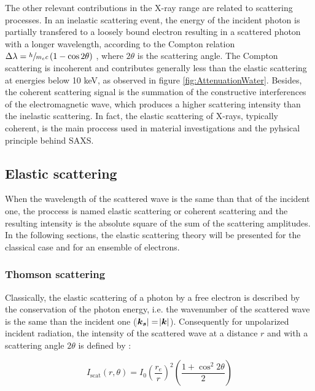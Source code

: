 The other relevant contributions in the X-ray range are related to scattering processes. In an inelastic scattering event, the energy of the incident photon is partially transfered to a loosely bound electron resulting in a scattered photon with a longer wavelength, according to the Compton relation $\Delta\lambda = \sfrac{h}{m_e c}\left( 1 - \cos{2\theta} \right) $ \citep{als-nielsen_elements_2011}, where $2\theta$ is the scattering angle. The Compton scattering is incoherent and contributes generally less than the elastic scattering at energies below 10 keV, as observed in figure \ref{fig:AttenuationWater}. Besides, the coherent scattering signal is the summation of the constructive interferences of the electromagnetic wave, which produces a higher scattering intensity than the inelastic scattering. In fact, the elastic scattering of X-rays, typically coherent, is the main proccess used in material investigations and the pyhsical principle behind SAXS.

\subsection{Elastic scattering}
\label{sec:ElasticScattering}

When the wavelength of the scattered wave is the same than that of the incident one, the proccess is named elastic scattering or coherent scattering and the resulting intensity is the absolute square of the sum of the scattering amplitudes. In the following sections, the elastic scattering theory will be presented for the classical case and for an ensemble of electrons.

\subsubsection{Thomson scattering}

Classically, the elastic scattering of a photon by a free electron is described by the conservation of the photon energy, i.e. the wavenumber of the scattered wave is the same than the incident one ($\abs{\bm{k_s}}=\abs{\bm{k}}$). Consequently for unpolarized incident radiation, the intensity of the scattered wave at a distance $r$ and with a scattering angle $2\theta$ is defined by \citep{warren_x-ray_1969}:

\begin{equation}
        I_{\text{scat}}\left( r,\theta \right)= I_0 \left( \frac{r_e}{r} \right) ^2 \left( \frac{1+\cos^2{2\theta}}{2} \right)
\end{equation}


